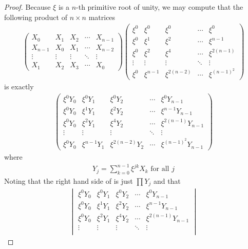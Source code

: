 \documentclass{report}
\begin{document}
\begin{proof}
Because $\xi$ is a $n$-th primitive root of unity, we may compute that the following product of $n\times n$ matrices 
 \begin{align*}
\begin{pmatrix} 
X_0 & X_1 & X_2 & \cdots & X_{n-1} \\
  X_{n-1} & X_0 & X_1 & \cdots & X_{n-2} \\
  \vdots & \vdots & \vdots & \ddots & \vdots \\
  X_1 & X_2 & X_3 & \cdots & X_0
\end{pmatrix} \begin{pmatrix} 
  \xi^0 & \xi^0& \xi^0 & \cdots & \xi^0 \\
  \xi^0 & \xi^1 & \xi^2 & \cdots & \xi^{n-1} \\
  \xi^0 & \xi^2 & \xi^4 & \cdots & \xi^{2(n-1)}  \\
  \vdots & \vdots & \vdots & \ddots & \vdots \\
  \xi^0 & \xi^{n-1} & \xi^{2(n-2)}& \cdots & \xi^{(n-1)^2}
\end{pmatrix}
\end{align*}
is exactly 
\begin{align*}
\begin{pmatrix} 
 \xi^0 Y_0 & \xi^0Y_1& \xi^0Y_2 & \cdots & \xi^0 Y_{n-1} \\
  \xi^0 Y_0 & \xi^1Y_1 & \xi^2Y_2 & \cdots & \xi^{n-1}Y_{n-1} \\
  \xi^0 Y_0 & \xi^2Y_1 & \xi^4 Y_2 & \cdots & \xi^{2(n-1)}Y_{n-1}  \\
  \vdots & \vdots & \vdots & \ddots & \vdots \\
  \xi^0Y_0 & \xi^{n-1}Y_1 & \xi^{2(n-2)} Y_2& \cdots & \xi^{(n-1)^2}Y_{n-1}
\end{pmatrix}
\end{align*}
where 
\begin{align*}
Y_j= \sum_{k=0}^{n-1} \xi^{jk} X_k\text{ for all }j
\end{align*}
Noting that the right hand side of  is just $\prod Y_j$ and that  
\begin{align*}
\begin{vmatrix} 
 \xi^0 Y_0 & \xi^0Y_1& \xi^0Y_2 & \cdots & \xi^0 Y_{n-1} \\
  \xi^0 Y_0 & \xi^1Y_1 & \xi^2Y_2 & \cdots & \xi^{n-1}Y_{n-1} \\
  \xi^0 Y_0 & \xi^2Y_1 & \xi^4 Y_2 & \cdots & \xi^{2(n-1)}Y_{n-1}  \\
  \vdots & \vdots & \vdots & \ddots & \vdots \\

\end{vmatrix}
\end{align*}
\end{proof}
\end{document}
